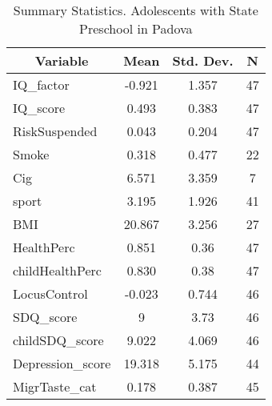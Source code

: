 
\begin{table}[htbp]\centering \caption{Summary Statistics. Adolescents with State Preschool in Padova \label{bothAdolmaternaStatPadova}}
\begin{tabular}{l c c  c}\hline\hline
\multicolumn{1}{c}{\textbf{Variable}} & \textbf{Mean}
 & \textbf{Std. Dev.} & \textbf{N}\\ \hline
IQ\_factor & -0.921 & 1.357  & 47\\
IQ\_score & 0.493 & 0.383  & 47\\
RiskSuspended & 0.043 & 0.204  & 47\\
Smoke & 0.318 & 0.477  & 22\\
Cig & 6.571 & 3.359  & 7\\
sport & 3.195 & 1.926  & 41\\
BMI & 20.867 & 3.256  & 27\\
HealthPerc & 0.851 & 0.36  & 47\\
childHealthPerc & 0.830 & 0.38  & 47\\
LocusControl & -0.023 & 0.744  & 46\\
SDQ\_score & 9 & 3.73  & 46\\
childSDQ\_score & 9.022 & 4.069  & 46\\
Depression\_score & 19.318 & 5.175  & 44\\
MigrTaste\_cat & 0.178 & 0.387  & 45\\
\hline\end{tabular}
\end{table}
